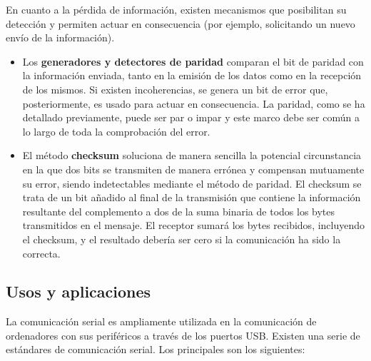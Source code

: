 En cuanto a la pérdida de información, existen mecanismos que posibilitan su detección y permiten actuar en consecuencia (por ejemplo, solicitando un nuevo envío de la información).

\begin{itemize}
\item Los  \textbf{generadores y detectores de paridad} comparan el bit de paridad con la información enviada, tanto en la emisión de los datos como en la recepción de los mismos. Si existen incoherencias, se genera un bit de error que, posteriormente, es usado para actuar en consecuencia. La paridad, como se ha detallado previamente, puede ser par o impar y este marco debe ser común a lo largo de toda la comprobación del error.

\item El método \textbf{checksum} soluciona de manera sencilla la potencial circunstancia en la que dos bits se transmiten de manera errónea y compensan mutuamente su error, siendo indetectables mediante el método de paridad. El checksum se trata de un bit añadido al final de la transmisión que contiene la información resultante del complemento a dos de la suma binaria de todos los bytes transmitidos en el mensaje. El receptor sumará los bytes recibidos, incluyendo el checksum, y el resultado debería ser cero si la comunicación ha sido la correcta.
\end{itemize}

\subsection{Usos y aplicaciones}

La comunicación serial es ampliamente utilizada en la comunicación de ordenadores con sus periféricos a través de los puertos USB. Existen una serie de estándares de comunicación serial. Los principales son los siguientes:

